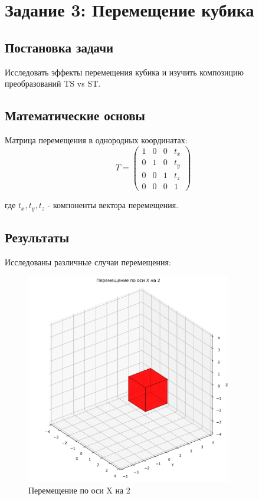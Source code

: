 \section*{Задание 3: Перемещение кубика}

\subsection*{Постановка задачи}
Исследовать эффекты перемещения кубика и изучить композицию преобразований TS vs ST.

\subsection*{Математические основы}
Матрица перемещения в однородных координатах:
\begin{equation}
T = \begin{pmatrix}
1 & 0 & 0 & t_x \\
0 & 1 & 0 & t_y \\
0 & 0 & 1 & t_z \\
0 & 0 & 0 & 1
\end{pmatrix}
\end{equation}

где $t_x, t_y, t_z$ - компоненты вектора перемещения.

\subsection*{Результаты}
Исследованы различные случаи перемещения:

\begin{figure}[H]
\centering
\includegraphics[width=0.8\textwidth]{images/task3/translate_x.png}
\caption{Перемещение по оси X на 2}
\end{figure}

